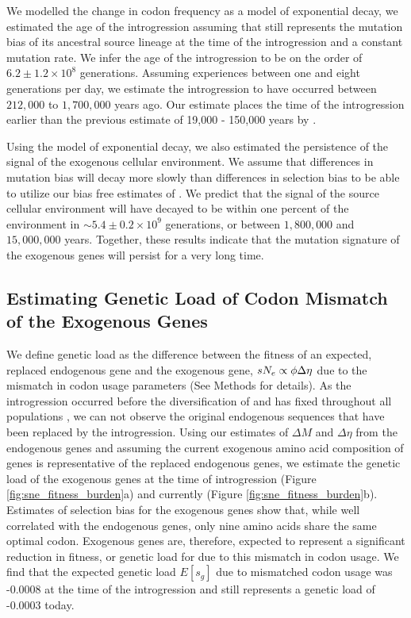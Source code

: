\documentclass[fleqn,letterpaper]{article}
\begin{document}
We modelled the change in codon frequency as a model of exponential decay, we estimated the age of the introgression assuming that \gossypii still represents the mutation bias of its ancestral source lineage at the time of the introgression and a constant mutation rate.
We infer the age of the introgression to be on the order of $6.2\pm1.2\times 10^8$ generations. 
Assuming \kluyveri experiences between one and eight generations per day, we estimate the introgression to have occurred between $212,000$ to $1,700,000$ years ago.
Our estimate places the time of the introgression earlier than the previous estimate of 19,000 - 150,000 years by \citet{friedrich2015}.

Using the model of exponential decay, we also estimated the persistence of the signal of the exogenous cellular environment.
We assume that differences in mutation bias will decay more slowly than differences in selection bias to be able to utilize our bias free estimates of \DM.
We predict that the \DM signal of the source cellular environment will have decayed to be within one percent of the \kluyveri environment in $\sim 5.4\pm0.2\times 10^9 $ generations, or between $1,800,000$ and $15,000,000$ years.
Together, these results indicate that the mutation signature of the exogenous genes will persist for a very long time.

\subsection*{Estimating Genetic Load of Codon Mismatch of the Exogenous Genes}

We define genetic load as the difference between the fitness of an expected, replaced endogenous gene and the exogenous gene, $sN_e \propto \phi {\Delta \eta}$ due to the mismatch in codon usage parameters (See Methods for details).
As the introgression occurred before the diversification of \kluyveri and has fixed throughout all populations \citep{friedrich2015}, we can not observe the original endogenous sequences that have been replaced by the introgression.
Using our estimates of $\Delta M$ and $\Delta \eta$ from the endogenous genes and assuming the current exogenous amino acid composition of genes is representative of the replaced endogenous genes, we estimate the genetic load of the exogenous genes at the time of introgression (Figure \ref{fig:sne_fitness_burden}a) and currently (Figure \ref{fig:sne_fitness_burden}b).
Estimates of selection bias for the exogenous genes show that, while well correlated with the endogenous genes, only nine amino acids share the same optimal codon.
Exogenous genes are, therefore, expected to represent a significant reduction in fitness, or genetic load for \kluyveri due to this mismatch in codon usage.
We find that the expected genetic load $E[s_g]$ due to mismatched codon usage was -0.0008 at the time of the introgression and still represents a genetic load of -0.0003 today.
\end{document}
